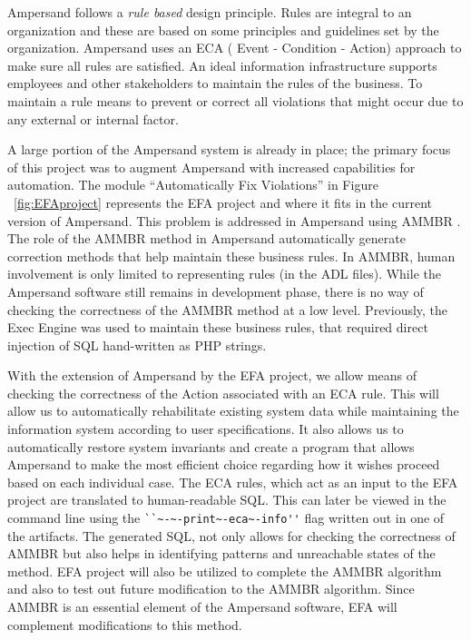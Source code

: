 

Ampersand follows a \emph{rule based} design principle. Rules are integral to an organization
and these are based on some principles and guidelines set by the organization.
Ampersand uses an ECA ( Event - Condition - Action) approach to make sure all rules are satisfied. An ideal information infrastructure supports employees and other stakeholders to maintain the rules of the business. To maintain a rule means to prevent or correct all violations that might occur due to any external or internal factor.
 
 A large portion of the Ampersand system is already in place; the primary focus of this project was to
augment Ampersand with increased capabilities for automation. The module ``Automatically Fix Violations'' in Figure ~\ref{fig:EFAproject} represents the EFA project and where it fits in the current version of Ampersand.
This problem is addressed in Ampersand using AMMBR \citep{Ampersand}. The role of the AMMBR method in Ampersand automatically generate correction methods that help maintain these business rules. In AMMBR, human involvement is only limited to representing rules (in the ADL files). While the Ampersand software still remains in development phase, there is no way of checking the correctness of the AMMBR method at a low level. Previously, the Exec Engine was used to maintain these business rules, that required direct injection of SQL hand-written as PHP strings. 
 
With the extension of Ampersand by the EFA project, we allow means of checking the correctness of the Action associated with an ECA rule. This will allow us to automatically rehabilitate existing system data while 
maintaining the information system according to user specifications. It also allows us to
automatically restore system invariants and create a program that allows 
Ampersand to make the most efficient choice regarding how it wishes proceed 
based on each individual case. The ECA rules, which act as an input to the EFA project are translated to human-readable SQL. This can later be viewed in the command line using the \verb|``~-~-print~-eca~-info''| flag written out in one of the artifacts. The generated SQL, not only allows for checking the correctness of AMMBR but also helps in identifying 
patterns and unreachable states of the method. EFA project will also be utilized to complete the AMMBR algorithm and also to test out future modification to the AMMBR algorithm.  Since AMMBR is an essential element of the Ampersand software, EFA will complement modifications to this method.


